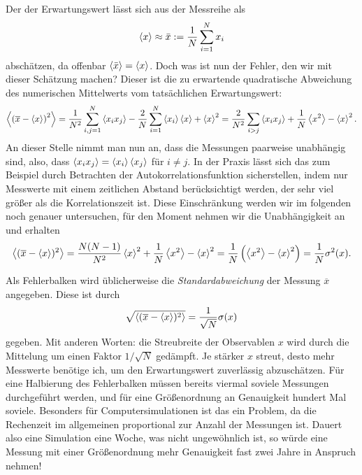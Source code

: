 Der der Erwartungswert lässt sich aus der Messreihe
als
\begin{equation}
  \label{eq:mean}
  \left\langle{x}\right\rangle \approx \bar{x} := \frac{1}{N}\sum_{i=1}^N x_i
\end{equation}
abschätzen, da offenbar $\left\langle{\bar{x}}\right\rangle = \left\langle{x}\right\rangle$. Doch was ist nun der
Fehler, den wir mit dieser Schätzung machen? Dieser ist die zu
erwartende quadratische Abweichung des numerischen Mittelwerts vom
tatsächlichen Erwartungswert:
\begin{equation}
  \left\langle{\left(\overline{x} - \left\langle{x}\right\rangle\right)^2}\right\rangle =
  \frac{1}{N^2}\sum_{i,j=1}^N \left\langle{x_ix_j}\right\rangle -
  \frac{2}{N}\sum_{i=1}^N \left\langle{x_i}\right\rangle\left\langle{x}\right\rangle + \left\langle{x}\right\rangle^2
  = \frac{2}{N^2}\sum_{i > j} \left\langle{x_ix_j}\right\rangle
  + \frac{1}{N}\left\langle{x^2}\right\rangle - \left\langle{x}\right\rangle^2.
\end{equation}
An dieser Stelle nimmt man nun an, dass die Messungen paarweise
unabhängig sind, also, dass $\left\langle{x_ix_j}\right\rangle = \left\langle{x_i}\right\rangle\left\langle{x_j}\right\rangle$ für
$i\neq j$. In der Praxis lässt sich das zum Beispiel durch Betrachten
der Autokorrelationsfunktion sicherstellen, indem nur Messwerte mit
einem zeitlichen Abstand berücksichtigt werden, der sehr viel größer
als die Korrelationszeit ist. Diese Einschränkung werden wir im
folgenden noch genauer untersuchen, für den Moment nehmen wir die
Unabhängigkeit an und erhalten
\begin{equation}
  \label{eq:errestvar}
  \left\langle{(\overline{x} - \left\langle{x}\right\rangle)^2}\right\rangle
  = \frac{N(N-1)}{N^2}\left\langle{x}\right\rangle^2 + \frac{1}{N}\left\langle{x^2}\right\rangle - \left\langle{x}\right\rangle^2
  = \frac{1}{N}\left(\left\langle{x^2}\right\rangle - \left\langle{x}\right\rangle^2\right)
  = \frac{1}{N}\sigma^2(x).
\end{equation}

Als Fehlerbalken wird üblicherweise die \emph{Standardabweichung} der
Messung $\overline{x}$ angegeben. Diese ist durch
\begin{equation}
  \sqrt{\left\langle{(\overline{x} - \left\langle{x}\right\rangle)^2}\right\rangle}
  = \frac{1}{\sqrt{N}}\sigma(x)
\end{equation}
gegeben. Mit anderen Worten: die Streubreite der Observablen $x$ wird
durch die Mittelung um einen Faktor $1/\sqrt{N}$ gedämpft. Je stärker
$x$ streut, desto mehr Messwerte benötige ich, um den Erwartungswert
zuverlässig abzuschätzen. Für eine Halbierung des Fehlerbalken müssen
bereits viermal soviele Messungen durchgeführt werden, und für eine
Größenordnung an Genauigkeit hundert Mal soviele. Besonders für
Computersimulationen ist das ein Problem, da die Rechenzeit im
allgemeinen proportional zur Anzahl der Messungen ist. Dauert also
eine Simulation eine Woche, was nicht ungewöhnlich ist, so würde eine
Messung mit einer Größenordnung mehr Genauigkeit fast zwei Jahre in
Anspruch nehmen!

